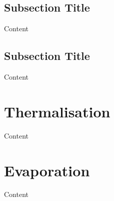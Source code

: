 \subsection{Subsection Title}

Content


\subsection{Subsection Title}

Content


\section{Thermalisation}

Content


\section{Evaporation}

Content